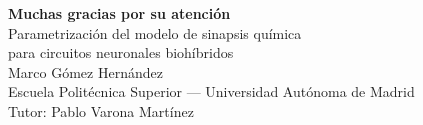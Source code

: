 \documentclass[10pt, aspectratio=169]{beamer}
\begin{document}
\begin{frame}[plain]
    \centering
    {\LARGE\bfseries\textcolor{azuloscuro}{Muchas gracias por su atención}}\\[2em]
    {\large\textcolor{azuloscuro}{Parametrización del modelo de sinapsis química\\para circuitos neuronales biohíbridos}}\\[2.5em]
    {\normalsize\textcolor{grisoscuro}{Marco Gómez Hernández}}\\[1.0em]
    {\scriptsize\textcolor{grismedio}{Escuela Politécnica Superior — Universidad Autónoma de Madrid}}\\[1.4em]
    {\small\textcolor{grismedio}{Tutor: Pablo Varona Martínez}}
\end{frame}
\end{document}
